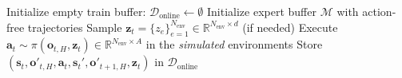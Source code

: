 \begin{algorithm}[h!]
	\caption{\method{} Pre-Training}\label{alg:bfm.zero}
\begin{footnotesize}
	\begin{algorithmic}[1]
    \State Initialize empty train buffer: $\mathcal{D}_{\mathrm{online}} \leftarrow \emptyset$
    \State Initialize expert buffer $\mathcal{M}$ with action-free trajectories
        \State Sample $\boldsymbol{z}_t = \{z_e\}_{e=1}^{N_{\mathrm{env}}}\in \mathbb{R}^{N_{\mathrm{env}}\times d}$ (if needed)
        \State Execute $\boldsymbol{a}_t \sim \pi(\boldsymbol{o}_{t,H}, \boldsymbol{z}_t) \in \mathbb{R}^{N_{\mathrm{env}}\times A}$ in the \emph{simulated} environments
        \State Store $(\boldsymbol{s}_t, \boldsymbol{o}'_{t,H}, \boldsymbol{a}_t, \boldsymbol{s}_t', \boldsymbol{o}'_{t+1,H}, \boldsymbol{z}_t)$  in $\mathcal{D}_{\mathrm{online}}$


\end{algorithmic}
\end{footnotesize}
\end{algorithm}
